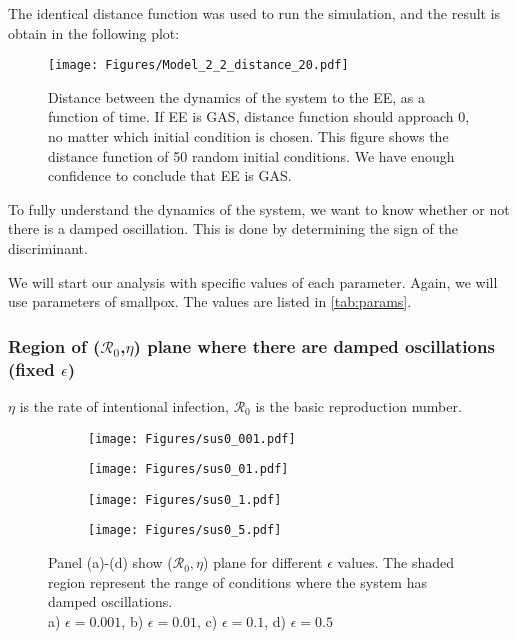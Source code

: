 \documentclass[12pt]{article}
\newcommand{\R}{\mathcal{R}}
\begin{document}
The identical distance function was used to run the simulation, and the result is obtain in the following plot:

\begin{figure}[H]
  \centering
  \texttt{[image: Figures/Model\_2\_2\_distance\_20.pdf]}
  \caption{Distance between the dynamics of the system to the EE, as a function of time. If EE is GAS, distance function should approach 0, no matter which initial condition is chosen. This figure shows the distance function of 50 random initial conditions. We have enough confidence to conclude that EE is GAS.}
\end{figure}

To fully understand the dynamics of the system, we want to know whether or not there is a damped oscillation. This is done by determining the sign of the discriminant.

We will start our analysis with specific values of each parameter. Again, we will use parameters of smallpox. The values are listed in \autoref{tab:params}.
\subsubsection{Region of ($\R_0$,$\eta$) plane where there are damped oscillations (fixed $\epsilon$)}

$\eta$ is the rate of intentional infection, $\R_0$ is the basic reproduction number.

\begin{figure}[h]
\centering

\begin{subfigure}[t]{.4\textwidth}
\centering
\texttt{[image: Figures/sus0\_001.pdf]}
        \caption{}\label{fig:fig_aa}
\end{subfigure}
%
\begin{subfigure}[t]{.4\textwidth}
\centering
\texttt{[image: Figures/sus0\_01.pdf]}
\caption{}\label{fig:fig_bb}
\end{subfigure}

\medskip

\begin{subfigure}[t]{.4\textwidth}
\centering
\vspace{0pt}%
\texttt{[image: Figures/sus0\_1.pdf]}
\caption{}\label{fig:fig_cc}
\end{subfigure}
%
\begin{subfigure}[t]{.4\textwidth}
\centering
\vspace{0pt}%
\texttt{[image: Figures/sus0\_5.pdf]}
\caption{}\label{fig:fig_dd}
\end{subfigure}
%
\begin{minipage}[t]{0.9\textwidth}
\caption{Panel (a)-(d) show ($\R_0,\eta$) plane for different $\epsilon$ values. The shaded region represent the range of conditions where the system has damped oscillations.\\
a) $\epsilon=0.001$, b) $\epsilon=0.01$, c) $\epsilon=0.1$, d) $\epsilon=0.5$}
\end{minipage}
\end{figure}
\end{document}
